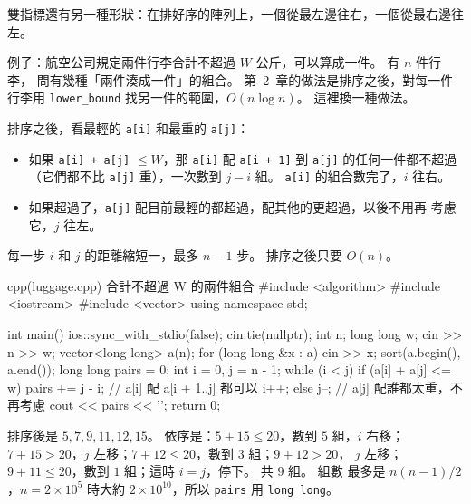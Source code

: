 雙指標還有另一種形狀：在排好序的陣列上，一個從最左邊往右，一個從最右邊往左。

例子：航空公司規定兩件行李合計不超過 $W$ 公斤，可以算成一件。 有 $n$ 件行李，
問有幾種「兩件湊成一件」的組合。 第~2~章的做法是排序之後，對每一件行李用
\texttt{lower\_bound} 找另一件的範圍，$O(n \log n)$。 這裡換一種做法。

排序之後，看最輕的 \texttt{a[i]} 和最重的 \texttt{a[j]}：

\begin{itemize}
\item 如果 \texttt{a[i] + a[j]} $\le W$，那 \texttt{a[i]} 配 \texttt{a[i + 1]}
到 \texttt{a[j]} 的任何一件都不超過（它們都不比 \texttt{a[j]} 重），一次數到
$j - i$ 組。 \texttt{a[i]} 的組合數完了，$i$ 往右。
\item 如果超過了，\texttt{a[j]} 配目前最輕的都超過，配其他的更超過，以後不用再
考慮它，$j$ 往左。
\end{itemize}

每一步 $i$ 和 $j$ 的距離縮短一，最多 $n - 1$ 步。 排序之後只要 $O(n)$。

\begin{example}[label=ex:ps-luggage]{cpp}{(luggage.cpp) 合計不超過 W 的兩件組合}
#include <algorithm>
#include <iostream>
#include <vector>
using namespace std;

int main() {
    ios::sync_with_stdio(false);
    cin.tie(nullptr);
    int n;
    long long w;
    cin >> n >> w;
    vector<long long> a(n);
    for (long long &x : a) {
        cin >> x;
    }
    sort(a.begin(), a.end());
    long long pairs = 0;
    int i = 0, j = n - 1;
    while (i < j) {
        if (a[i] + a[j] <= w) {
            pairs += j - i;      // a[i] 配 a[i + 1..j] 都可以
            i++;
        } else {
            j--;                 // a[j] 配誰都太重，不再考慮
        }
    }
    cout << pairs << '\n';
    return 0;
}
\end{example}


排序後是 $5, 7, 9, 11, 12, 15$。 依序是：$5 + 15 \le 20$，數到 $5$ 組，$i$
右移；$7 + 15 > 20$，$j$ 左移；$7 + 12 \le 20$，數到 $3$ 組；$9 + 12 > 20$，
$j$ 左移；$9 + 11 \le 20$，數到 $1$ 組；這時 $i = j$，停下。 共 $9$ 組。 組數
最多是 $n(n - 1)/2$，$n = 2 \times 10^5$ 時大約 $2 \times 10^{10}$，所以
\texttt{pairs} 用 \texttt{long long}。

